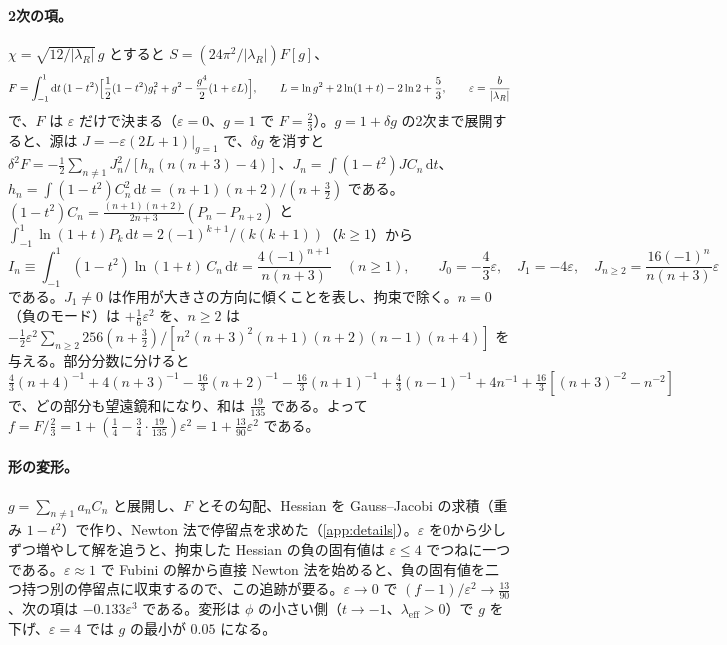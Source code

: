 \documentclass[a4paper,10pt]{ltjsarticle}
\newcommand{\dd}{\mathrm{d}}
\begin{document}
\paragraph{2次の項。}$\chi=\sqrt{12/|\lambda_R|}\,g$ とすると $S=(24\pi^2/|\lambda_R|)F[g]$、
\begin{equation*}
F=\int_{-1}^{1}\dd t\,(1-t^2)\Bigl[\frac12(1-t^2)g_t^2+g^2-\frac{g^4}{2}(1+\varepsilon L)\Bigr],\qquad L=\ln g^2+2\ln(1+t)-2\ln2+\frac53,\qquad\varepsilon=\frac{b}{|\lambda_R|}
\end{equation*}
で、$F$ は $\varepsilon$ だけで決まる（$\varepsilon=0$、$g=1$ で $F=\frac23$）。$g=1+\delta g$ の2次まで展開すると、源は $J=-\varepsilon(2L+1)|_{g=1}$ で、$\delta g$ を消すと $\delta^2F=-\frac12\sum_{n\ne1}J_n^2/[h_n(n(n+3)-4)]$、$J_n=\int(1-t^2)JC_n\,\dd t$、$h_n=\int(1-t^2)C_n^2\,\dd t=(n+1)(n+2)/(n+\frac32)$ である。$(1-t^2)C_n=\frac{(n+1)(n+2)}{2n+3}(P_n-P_{n+2})$ と $\int_{-1}^{1}\ln(1+t)P_k\,\dd t=2(-1)^{k+1}/(k(k+1))$（$k\ge1$）から
\begin{equation*}
I_n\equiv\int_{-1}^{1}(1-t^2)\ln(1+t)\,C_n\,\dd t=\frac{4(-1)^{n+1}}{n(n+3)}\quad(n\ge1),\qquad
J_0=-\frac43\varepsilon,\quad J_1=-4\varepsilon,\quad J_{n\ge2}=\frac{16(-1)^n}{n(n+3)}\varepsilon
\end{equation*}
である。$J_1\ne0$ は作用が大きさの方向に傾くことを表し、拘束で除く。$n=0$（負のモード）は $+\frac16\varepsilon^2$ を、$n\ge2$ は $-\frac12\varepsilon^2\sum_{n\ge2}256(n+\frac32)/[n^2(n+3)^2(n+1)(n+2)(n-1)(n+4)]$ を与える。部分分数に分けると $\frac43(n+4)^{-1}+4(n+3)^{-1}-\frac{16}{3}(n+2)^{-1}-\frac{16}{3}(n+1)^{-1}+\frac43(n-1)^{-1}+4n^{-1}+\frac{16}{3}[(n+3)^{-2}-n^{-2}]$ で、どの部分も望遠鏡和になり、和は $\frac{19}{135}$ である。よって $f=F/\frac23=1+(\frac14-\frac34\cdot\frac{19}{135})\varepsilon^2=1+\frac{13}{90}\varepsilon^2$ である。

\paragraph{形の変形。}$g=\sum_{n\ne1}a_nC_n$ と展開し、$F$ とその勾配、Hessian を Gauss--Jacobi の求積（重み $1-t^2$）で作り、Newton 法で停留点を求めた（\ref{app:details}）。$\varepsilon$ を0から少しずつ増やして解を追うと、拘束した Hessian の負の固有値は $\varepsilon\le4$ でつねに一つである。$\varepsilon\approx1$ で Fubini の解から直接 Newton 法を始めると、負の固有値を二つ持つ別の停留点に収束するので、この追跡が要る。$\varepsilon\to0$ で $(f-1)/\varepsilon^2\to\frac{13}{90}$、次の項は $-0.133\varepsilon^3$ である。変形は $\phi$ の小さい側（$t\to-1$、$\lambda_{\mathrm{eff}}>0$）で $g$ を下げ、$\varepsilon=4$ では $g$ の最小が $0.05$ になる。
\end{document}
